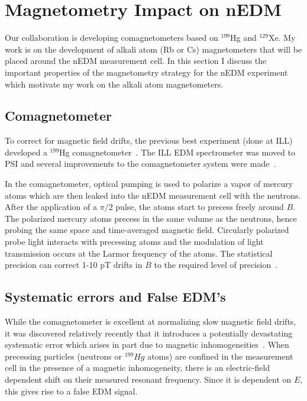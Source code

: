 \section{ Magnetometry Impact on nEDM}


Our collaboration is developing comagnetometers based on $^{199}$Hg
and $^{129}$Xe.  My work is on the development of alkali atom (Rb or
Cs) magnetometers that will be placed around the nEDM measurement
cell.  In this section I discuss the important properties of the
magnetometry strategy for the nEDM experiment which motivate my work
on the alkali atom magnetometers.

\subsection{Comagnetometer}

To correct for magnetic field drifts, the previous best experiment
(done at ILL) developed a $^{199}$Hg
comagnetometer~\cite{bib:green,bib:baker}.  The ILL EDM spectrometer
was moved to PSI and several improvements to the comagnetometer system
were made~\cite{bib:hgbetter}.

In the comagnetometer, optical pumping is used to polarize a vapor of
mercury atoms which are then leaked into the nEDM measurement cell
with the neutrons.  After the application of a $\pi/2$ pulse, the
atoms start to precess freely around $B$.  The polarized mercury atoms
precess in the same volume as the neutrons, hence probing the same
space and time-averaged magnetic field.  Circularly polarized probe
light interacts with precessing atoms and the modulation of light
transmission occurs at the Larmor frequency of the atoms.  The
statistical precision can correct 1-10 pT drifts in $B$ to the
required level of precision~\cite{bib:hgbetter}.


\subsection{Systematic errors and False EDM's}

While the comagnetometer is excellent at normalizing slow magnetic
field drifts, it was discovered relatively recently that it introduces
a potentially devastating systematic error which arises in part due to
magnetic inhomogeneities~\cite{bib:gp1}.  When precessing particles
(neutrons or $^{199}Hg$ atoms) are confined in the measurement cell in
the presence of a magnetic inhomogeneity, there is an electric-field
dependent shift on their measured resonant frequency.  Since it is
dependent on $E$, this gives rise to a false EDM signal.

